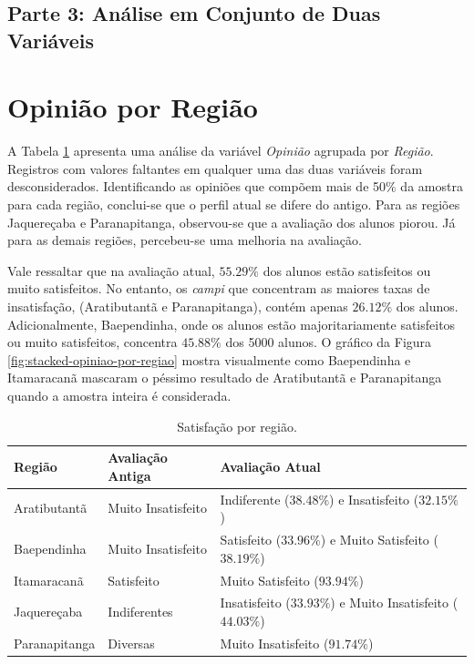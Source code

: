 \documentclass[10pt,a4paper,oneside]{article}
\newcommand{\arat}{Aratibutantã\xspace}
\newcommand{\baep}{Baependinha\xspace}
\newcommand{\itam}{Itamaracanã\xspace}
\newcommand{\jaqu}{Jaquereçaba\xspace}
\newcommand{\para}{Paranapitanga\xspace}
\begin{document}
\clearpage
\begin{center}
\section*{Parte 3: Análise em Conjunto de Duas Variáveis}
\end{center}

\section{Opinião por Região}
\label{section:opiniao-regiao}

A Tabela \ref{table:satisfacao-regiao} apresenta uma análise da variável \textit{Opinião} agrupada por \textit{Região}. Registros com valores faltantes em qualquer uma das duas variáveis foram desconsiderados. Identificando as opiniões que compõem mais de 50\% da amostra para cada região, conclui-se que o perfil atual se difere do antigo. Para as regiões \jaqu e \para, observou-se que a avaliação dos alunos piorou. Já para as demais regiões, percebeu-se uma melhoria na avaliação. 

Vale ressaltar que na avaliação atual, $55.29\%$ dos alunos estão satisfeitos ou muito satisfeitos. No entanto, os \textit{campi} que concentram as maiores taxas de insatisfação, (\arat e \para), contém apenas $26.12\%$ dos alunos. Adicionalmente, \baep, onde os alunos estão majoritariamente satisfeitos ou muito satisfeitos, concentra $45.88\%$ dos 5000 alunos. O gráfico da Figura \ref{fig:stacked-opiniao-por-regiao} mostra visualmente como \baep e \itam mascaram o péssimo resultado de \arat e \para quando a amostra inteira é considerada.

\begin{table}[!h]
	\footnotesize
	\centering
	\caption{Satisfação por região.}
	\vspace{0.5em}
	\label{table:satisfacao-regiao}
	\begin{tabular}{l l l}
		\toprule
		\textbf{Região} & \textbf{Avaliação Antiga} & \textbf{Avaliação Atual}                \\
		\midrule
		\arat  & Muito Insatisfeito & Indiferente ($38.48\%$) e Insatisfeito ($32.15\%$)      \\
		\baep  & Muito Insatisfeito & Satisfeito ($33.96\%$) e Muito Satisfeito ($38.19\%$)   \\
		\itam  & Satisfeito         & Muito Satisfeito ($93.94\%$)                            \\
		\jaqu  & Indiferentes       & Insatisfeito ($33.93\%$) e Muito Insatisfeito ($44.03\%$) \\
		\para  & Diversas           & Muito Insatisfeito ($91.74\%$)                          \\
		\bottomrule
	\end{tabular}
\end{table}
\end{document}
